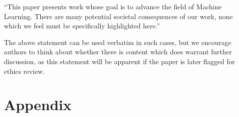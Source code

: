 \documentclass{article}
\theoremstyle{plain}
\theoremstyle{definition}
\theoremstyle{remark}
\begin{document}
``This paper presents work whose goal is to advance the field of Machine
Learning. There are many potential societal consequences of our work, none
which we feel must be specifically highlighted here.''

The above statement can be used verbatim in such cases, but we encourage
authors to think about whether there is content which does warrant further
discussion, as this statement will be apparent if the paper is later flagged
for ethics review.




\newpage
\appendix
\onecolumn
\section*{Appendix}

\end{document}
